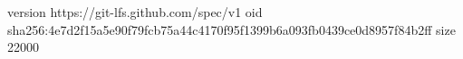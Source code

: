 version https://git-lfs.github.com/spec/v1
oid sha256:4e7d2f15a5e90f79fcb75a44c4170f95f1399b6a093fb0439ce0d8957f84b2ff
size 22000
